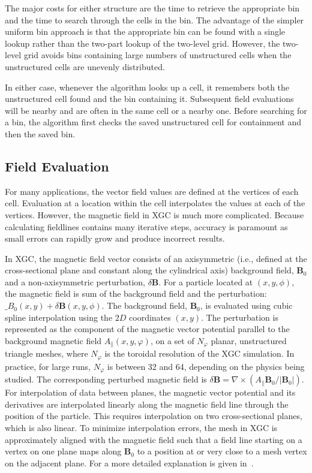The major costs for either structure are the time to retrieve the appropriate bin and the time to search through the cells in the bin.
The advantage of the simpler uniform bin approach is that the appropriate bin can be found with a single lookup rather than the two-part lookup of the two-level grid.
However, the two-level grid avoids bins containing large numbers of unstructured cells when the unstructured cells are unevenly distributed.

In either case, whenever the algorithm looks up a cell, it remembers both the unstructured cell found and the bin containing it.
Subsequent field evaluations will be nearby and are often in the same cell or a nearby one.
Before searching for a bin, the algorithm first checks the saved unstructured cell for containment and then the saved bin.

\subsection{Field Evaluation}
For many applications, the vector field values are defined at the vertices of each cell. Evaluation at a location within the cell interpolates the values at each of the vertices. However, the magnetic field in XGC is much more complicated. Because calculating fieldlines contains many iterative steps, accuracy is paramount as small errors can rapidly grow and produce incorrect results.

In XGC, the magnetic field vector consists of an axisymmetric (i.e., defined at the cross-sectional plane and constant along the cylindrical axis) background field, $\boldsymbol{B}_0$ and a non-axisymmetric perturbation, $\delta\boldsymbol{B}$.
For a particle located at $(x,y,\phi)$, the magnetic field is sum of the background field and the perturbation: $\boldsymbol_{B}_0(x,y) + \delta\boldsymbol{B}(x,y,\phi)$.
The background field, $\boldsymbol{B}_0$,  is evaluated using cubic spline interpolation using the $2D$ coordinates $(x,y)$.
The perturbation is represented as the component of the magnetic vector potential parallel to the background magnetic field $A_\parallel(x,y,\varphi)$, on a set of $N_\varphi$ planar, unstructured triangle meshes, where $N_\varphi$ is the toroidal resolution of the XGC simulation.  In practice, for large runs, $N_\varphi$ is between 32 and 64, depending on the physics being studied. The corresponding perturbed magnetic field is $\delta\boldsymbol{B}=\nabla\times(A_\parallel \boldsymbol{B}_0/|\boldsymbol{B}_0|)$.
For interpolation of data between planes, the magnetic vector potential and its derivatives are interpolated linearly along the magnetic field line through the position of the particle. This requires interpolation on two cross-sectional planes, which is also linear. To minimize interpolation errors, the mesh in XGC is approximately aligned with the magnetic field such that a field line starting on a vertex on one plane maps along $\boldsymbol{B}_0$ to a position at or very close to a mesh vertex on the adjacent plane. For a more detailed explanation is given in~\cite{moritaka_2019, Hariri2013, HAGER2016644}.

